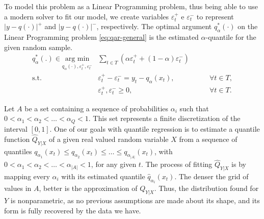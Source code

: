 To model this problem as a Linear Programming problem, thus being able to use a modern solver to fit our model,  we create variables $\varepsilon^+_t$ e $\varepsilon^-_t$ to represent $|y-q(\cdot)|^+$ and $|y-q(\cdot)|^-$, respectively. The optimal argument $q_\alpha^*(\cdot)$ on the Linear Programming problem \ref{eq:qar-general} is the estimated $\alpha$-quantile for the given random sample.
\begin{equation}
 \begin{aligned}q^*_\alpha(.) \in \underset{q_\alpha (\cdot),\varepsilon_{t}^{+}, \varepsilon_{t}^{-}}{\text{arg min}} & \sum_{t \in T}\left(\alpha \varepsilon_{t}^{+}+(1-\alpha)\varepsilon_{t}^{-}\right) & \\
\mbox{s.t. } & \varepsilon_{t}^{+}-\varepsilon_{t}^{-}=y_{t}-q_\alpha(x_t), & \qquad\forall t \in T,\\
& \varepsilon_t^+,\varepsilon_t^- \geq 0, & \qquad \forall t \in T.
\end{aligned}
\label{eq:qar-general}
\end{equation}

Let $A$ be a set containing a sequence of probabilities  $\alpha_i$ such that $0 < \alpha_1 < \alpha_2 < \dots < \alpha_Q < 1$. This set represents a finite discretization of the interval $[0,1]$.
One of our goals with quantile regression is to estimate a quantile function $\hat{Q}_{Y|X}$ of a given real valued random variable $X$ from a sequence of quantiles $q_{\alpha_1}(x_t) \leq q_{\alpha_2}(x_t) \leq \dots \leq q_{\alpha_{|A|}}(x_t)$, with $0 < \alpha_1 < \alpha_2 < \dots < \alpha_{|A|} < 1$, for any given $t$.
The process of fitting $\hat{Q}_{Y|X}$ is by mapping every $\alpha_i$ with its estimated quantile $\hat{q}_{\alpha_i}(x_t)$.
The denser the grid of values in $A$, better is the approximation of $Q_{Y|X}$.
Thus, the distribution found for $Y$ is nonparametric, as no previous assumptions are made about its shape, and its form is fully recovered by the data we have.


